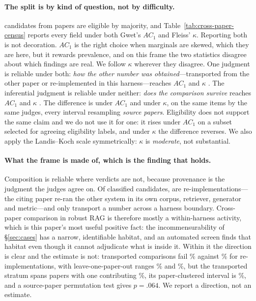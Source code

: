 \documentclass[11pt]{article}
\begin{document}
\paragraph{The split is by kind of question, not by difficulty.}
\CensusEligible{} candidates from \CensusPapers{} papers are eligible by
majority, and Table~\ref{tab:cross-paper-census} reports every field under both
Gwet's $AC_1$ and Fleiss' $\kappa$. Reporting both is not decoration. $AC_1$ is
the right choice when marginals are skewed, which they are here, but it rewards
prevalence, and on this frame the two statistics disagree about which findings
are real. We follow $\kappa$ wherever they disagree. One judgment is reliable
under both: \emph{how the other number was obtained}---transported from the
other paper or re-implemented in this harness---reaches $AC_1$ \DecProv{} and
$\kappa$ \DecProvK{}. The inferential judgment is reliable under neither:
\emph{does the comparison survive} reaches $AC_1$ \DecVerdict{} and $\kappa$
\DecVerdictK{}. The difference is \DecGap{} \DecGapCI{} under $AC_1$ and
\DecGapK{} \DecGapKCI{} under $\kappa$, on the same items by the same judges,
every interval resampling \emph{source papers}. Eligibility does not support the
same claim and we do not use it for one: it rises under $AC_1$ on a subset
selected for agreeing eligibility labels, and under $\kappa$ the difference
reverses. We also apply the Landis--Koch scale symmetrically: $\kappa$
\DecProvK{} is \emph{moderate}, not substantial.

\paragraph{What the frame is made of, which is the finding that holds.}
Composition is reliable where verdicts are not, because provenance is the
judgment the judges agree on. Of \ProvClassified{} classified candidates,
\ProvReimplemented{} are re-implementations---the citing paper re-ran the other
system in its own corpus, retriever, generator and metric---and only
\ProvTransported{} transport a number across a harness boundary. Cross-paper
comparison in robust RAG is therefore mostly a within-harness activity, which is
this paper's most useful positive fact: the incommensurability of
\S\ref{sec:cases} has a narrow, identifiable habitat, and an automated screen
finds that habitat even though it cannot adjudicate what is inside it. Within it
the direction is clear and the estimate is not: transported comparisons fail
\ProvTransFail\% against \ProvReimplFail\% for re-implementations, with
leave-one-paper-out ranges \ProvTransLOO\% and \ProvReimplLOO\%, but the
transported stratum spans \ProvTransPapers{} papers with one contributing
\ProvTransLargest\%, its paper-clustered interval is \ProvTransFailCI\%, and a
source-paper permutation test gives $p=.064$. We report a direction, not an
estimate.
\end{document}

